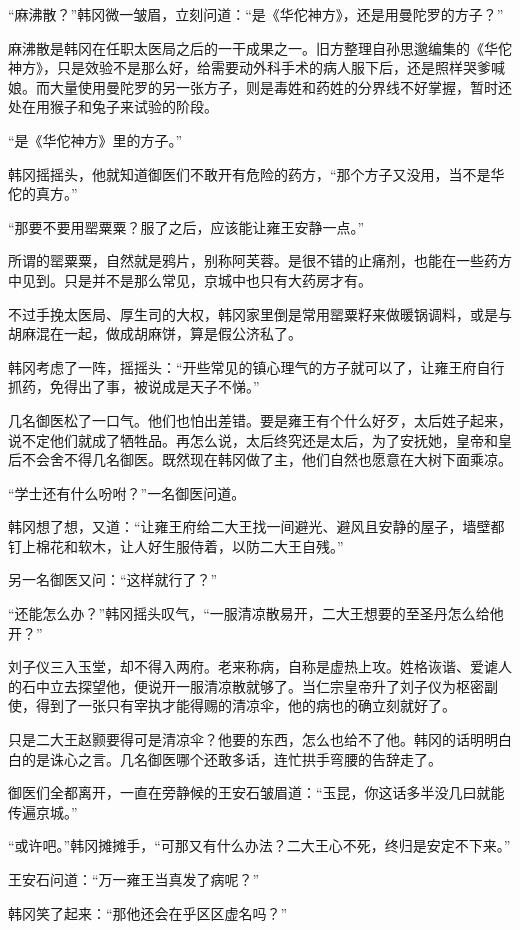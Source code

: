 “麻沸散？”韩冈微一皱眉，立刻问道：“是《华佗神方》，还是用曼陀罗的方子？”

麻沸散是韩冈在任职太医局之后的一干成果之一。旧方整理自孙思邈编集的《华佗神方》，只是效验不是那么好，给需要动外科手术的病人服下后，还是照样哭爹喊娘。而大量使用曼陀罗的另一张方子，则是毒姓和药姓的分界线不好掌握，暂时还处在用猴子和兔子来试验的阶段。

“是《华佗神方》里的方子。”

韩冈摇摇头，他就知道御医们不敢开有危险的药方，“那个方子又没用，当不是华佗的真方。”

“那要不要用罂粟粟？服了之后，应该能让雍王安静一点。”

所谓的罂粟粟，自然就是鸦片，别称阿芙蓉。是很不错的止痛剂，也能在一些药方中见到。只是并不是那么常见，京城中也只有大药房才有。

不过手挽太医局、厚生司的大权，韩冈家里倒是常用罂粟籽来做暖锅调料，或是与胡麻混在一起，做成胡麻饼，算是假公济私了。

韩冈考虑了一阵，摇摇头：“开些常见的镇心理气的方子就可以了，让雍王府自行抓药，免得出了事，被说成是天子不悌。”

几名御医松了一口气。他们也怕出差错。要是雍王有个什么好歹，太后姓子起来，说不定他们就成了牺牲品。再怎么说，太后终究还是太后，为了安抚她，皇帝和皇后不会舍不得几名御医。既然现在韩冈做了主，他们自然也愿意在大树下面乘凉。

“学士还有什么吩咐？”一名御医问道。

韩冈想了想，又道：“让雍王府给二大王找一间避光、避风且安静的屋子，墙壁都钉上棉花和软木，让人好生服侍着，以防二大王自残。”

另一名御医又问：“这样就行了？”

“还能怎么办？”韩冈摇头叹气，“一服清凉散易开，二大王想要的至圣丹怎么给他开？”

刘子仪三入玉堂，却不得入两府。老来称病，自称是虚热上攻。姓格诙谐、爱谑人的石中立去探望他，便说开一服清凉散就够了。当仁宗皇帝升了刘子仪为枢密副使，得到了一张只有宰执才能得赐的清凉伞，他的病也的确立刻就好了。

只是二大王赵颢要得可是清凉伞？他要的东西，怎么也给不了他。韩冈的话明明白白的是诛心之言。几名御医哪个还敢多话，连忙拱手弯腰的告辞走了。

御医们全都离开，一直在旁静候的王安石皱眉道：“玉昆，你这话多半没几曰就能传遍京城。”

“或许吧。”韩冈摊摊手，“可那又有什么办法？二大王心不死，终归是安定不下来。”

王安石问道：“万一雍王当真发了病呢？”

韩冈笑了起来：“那他还会在乎区区虚名吗？”

